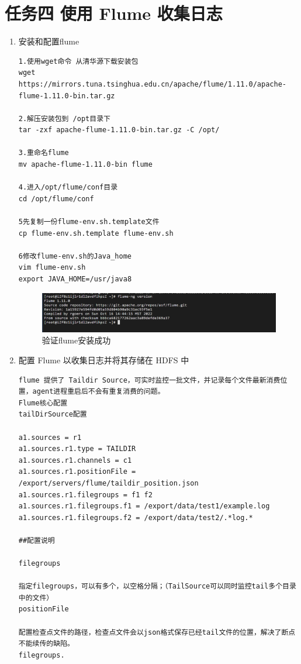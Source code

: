 \documentclass{article}
\begin{document}
\section{任务四 使用 Flume 收集日志}

\begin{enumerate}
    \item 安装和配置flume
    \begin{lstlisting}
1.使用wget命令 从清华源下载安装包
wget https://mirrors.tuna.tsinghua.edu.cn/apache/flume/1.11.0/apache-flume-1.11.0-bin.tar.gz

2.解压安装包到 /opt目录下
tar -zxf apache-flume-1.11.0-bin.tar.gz -C /opt/

3.重命名flume
mv apache-flume-1.11.0-bin flume

4.进入/opt/flume/conf目录
cd /opt/flume/conf

5先复制一份flume-env.sh.template文件
cp flume-env.sh.template flume-env.sh

6修改flume-env.sh的Java_home
vim flume-env.sh
export JAVA_HOME=/usr/java8
    \end{lstlisting}
    \begin{figure}[htp]
        \centering
        \includegraphics[width=15cm]{flume_version.png}
        \caption{验证flume安装成功}
        \label{pic7}
    \end{figure}
    \item 配置 Flume 以收集日志并将其存储在 HDFS 中
    \begin{lstlisting}
flume 提供了 Taildir Source，可实时监控一批文件，并记录每个文件最新消费位置，agent进程重启后不会有重复消费的问题。
Flume核心配置
tailDirSource配置

a1.sources = r1
a1.sources.r1.type = TAILDIR
a1.sources.r1.channels = c1
a1.sources.r1.positionFile = /export/servers/flume/taildir_position.json
a1.sources.r1.filegroups = f1 f2
a1.sources.r1.filegroups.f1 = /export/data/test1/example.log
a1.sources.r1.filegroups.f2 = /export/data/test2/.*log.*

##配置说明

filegroups

指定filegroups，可以有多个，以空格分隔；（TailSource可以同时监控tail多个目录中的文件）
positionFile

配置检查点文件的路径，检查点文件会以json格式保存已经tail文件的位置，解决了断点不能续传的缺陷。
filegroups.


\end{lstlisting}
\end{enumerate}
\end{document}
